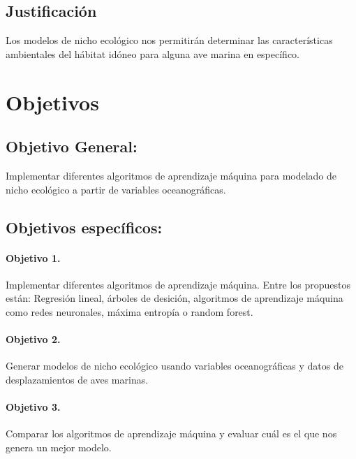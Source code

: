 \subsection*{Justificación}

Los modelos de nicho ecológico nos permitirán determinar las características
ambientales del hábitat idóneo para alguna ave marina en específico.

\section*{Objetivos}
\subsection*{Objetivo General:}
Implementar diferentes algoritmos de aprendizaje máquina para modelado de nicho
ecológico a partir de variables oceanográficas.

\subsection*{Objetivos específicos:}

\paragraph*{Objetivo 1.}

Implementar diferentes algoritmos de aprendizaje máquina. Entre los
propuestos están: Regresión lineal, árboles de desición, algoritmos de
aprendizaje máquina como redes neuronales, máxima entropía o random forest.

\paragraph*{Objetivo 2.}

Generar modelos de nicho ecológico usando variables oceanográficas y datos
de desplazamientos de aves marinas.

\paragraph*{Objetivo 3.}

Comparar los algoritmos de aprendizaje máquina y evaluar cuál es el que
nos genera un mejor modelo.

